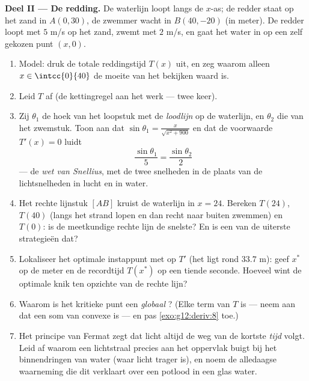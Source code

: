 \begin{problem}
\medskip
\noindent\textbf{Deel II --- De redding.}
De waterlijn loopt langs de $x$-as; de redder staat op het zand in
$A(0, 30)$, de zwemmer wacht in $B(40, -20)$ (in meter). De redder loopt met
$5$ m/s op het zand, zwemt met $2$ m/s, en gaat het water in op een zelf
gekozen punt $(x, 0)$.
\begin{enumerate}[resume]
  \item Model: druk de totale reddingstijd $T(x)$ uit, en zeg waarom alleen
        $x \in \intcc{0}{40}$ de moeite van het bekijken waard is.
  \item Leid $T$ af (de kettingregel aan het werk --- twee keer).
  \item Zij $\theta_1$ de hoek van het loopstuk met de \emph{loodlijn} op de
        waterlijn, en $\theta_2$ die van het zwemstuk. Toon aan dat
        $\sin\theta_1 = \frac{x}{\sqrt{x^2 + 900}}$ en dat de voorwaarde
        $T'(x) = 0$ luidt
        \[
        \frac{\sin\theta_1}{5} = \frac{\sin\theta_2}{2}
        \]
        --- de \emph{wet van Snellius}, met de twee snelheden in de plaats van
        de lichtsnelheden in lucht en in water.
  \item Het rechte lijnstuk $[AB]$ kruist de waterlijn in $x = 24$. Bereken
        $T(24)$, $T(40)$ (langs het strand lopen en dan recht naar buiten
        zwemmen) en $T(0)$: is de meetkundige rechte lijn de snelste? En is
        een van de uiterste strategieën dat?
  \item Lokaliseer het optimale instappunt met  op $T'$ (het ligt
        rond $33.7$ m): geef $x^*$ op de meter en de recordtijd $T(x^*)$ op
        een tiende seconde. Hoeveel wint de optimale knik ten opzichte van de
        rechte lijn?
  \item Waarom is het kritieke punt een \emph{globaal} ? (Elke term van
        $T$ is  --- neem aan dat een som van convexe   is
        --- en pas \cref{exo:g12:deriv:8} toe.)
  \item Het principe van Fermat zegt dat licht altijd de weg van de kortste
        \emph{tijd} volgt. Leid af waarom een lichtstraal precies aan het
        oppervlak buigt bij het binnendringen van water (waar licht trager
        is), en noem de alledaagse waarneming die dit verklaart over een
        potlood in een glas water.
\end{enumerate}


\end{problem}
